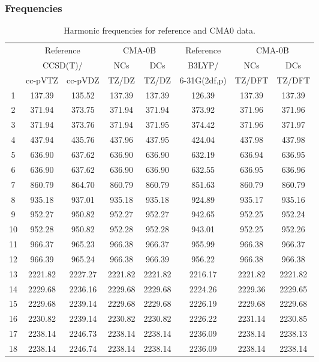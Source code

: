 \documentclass[10pt,oneside]{article}
\begin{document}
\subsubsection*{Frequencies}
\begin{table}[h!]
\centering
\caption{Harmonic frequencies for reference and CMA0 data.}
\begin{tabular}{cccccccc}
\toprule
{} & \multicolumn{2}{c}{Reference} & \multicolumn{2}{c}{CMA-0B} &    Reference & \multicolumn{2}{c}{CMA-0B} \\
{} & \multicolumn{2}{c}{CCSD(T)/} &     NCs &     DCs &       B3LYP/ &     NCs &     DCs \\
{} &   cc-pVTZ & cc-pVDZ &   TZ/DZ &   TZ/DZ & 6-31G(2df,p) &  TZ/DFT &  TZ/DFT \\
\midrule
1  &    137.39 &  135.52 &  137.39 &  137.39 &       126.39 &  137.39 &  137.39 \\
2  &    371.94 &  373.75 &  371.94 &  371.94 &       373.92 &  371.96 &  371.96 \\
3  &    371.94 &  373.76 &  371.94 &  371.95 &       374.42 &  371.96 &  371.97 \\
4  &    437.94 &  435.76 &  437.96 &  437.95 &       424.04 &  437.98 &  437.98 \\
5  &    636.90 &  637.62 &  636.90 &  636.90 &       632.19 &  636.94 &  636.95 \\
6  &    636.90 &  637.62 &  636.90 &  636.90 &       632.55 &  636.95 &  636.96 \\
7  &    860.79 &  864.70 &  860.79 &  860.79 &       851.63 &  860.79 &  860.79 \\
8  &    935.18 &  937.01 &  935.18 &  935.18 &       924.89 &  935.17 &  935.16 \\
9  &    952.27 &  950.82 &  952.27 &  952.27 &       942.65 &  952.25 &  952.24 \\
10 &    952.28 &  950.82 &  952.28 &  952.28 &       943.01 &  952.25 &  952.26 \\
11 &    966.37 &  965.23 &  966.38 &  966.37 &       955.99 &  966.38 &  966.37 \\
12 &    966.39 &  965.24 &  966.38 &  966.39 &       956.22 &  966.38 &  966.38 \\
13 &   2221.82 & 2227.27 & 2221.82 & 2221.82 &      2216.17 & 2221.82 & 2221.82 \\
14 &   2229.68 & 2236.16 & 2229.68 & 2229.68 &      2224.26 & 2229.36 & 2229.65 \\
15 &   2229.68 & 2239.14 & 2229.68 & 2229.68 &      2226.19 & 2229.68 & 2229.68 \\
16 &   2230.82 & 2239.14 & 2230.82 & 2230.82 &      2226.22 & 2231.14 & 2230.85 \\
17 &   2238.14 & 2246.73 & 2238.14 & 2238.14 &      2236.09 & 2238.14 & 2238.13 \\
18 &   2238.14 & 2246.74 & 2238.14 & 2238.14 &      2236.09 & 2238.14 & 2238.14 \\
\bottomrule
\end{tabular}
\end{table}
\end{document}
